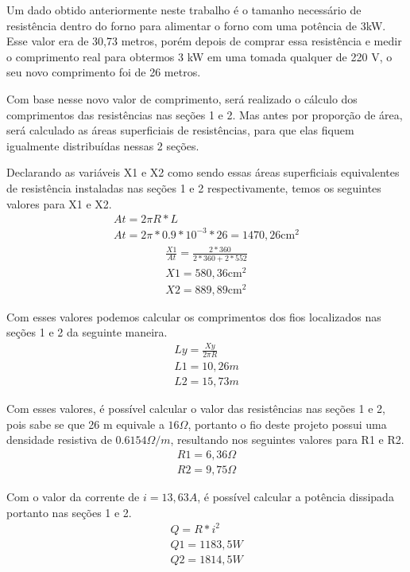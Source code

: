 Um dado obtido anteriormente neste trabalho é o tamanho necessário de resistência dentro do forno para alimentar o forno com uma potência de 3kW. Esse valor era de 30,73 metros, porém depois de comprar essa resistência e medir o comprimento real para obtermos 3 kW em uma tomada qualquer de 220 V, o seu novo comprimento foi de 26 metros.

Com base nesse novo valor de comprimento, será realizado o cálculo dos comprimentos das resistências nas seções 1 e 2. Mas antes por proporção de área, será calculado as áreas superficiais de resistências, para que elas fiquem igualmente distribuídas nessas 2 seções.

Declarando as variáveis X1 e X2 como sendo essas áreas superficiais equivalentes de resistência instaladas nas seções 1 e 2 respectivamente, temos os seguintes valores para X1 e X2.
\begin{gather}
    At = 2\pi R*L \\
    At = 2\pi * 0.9 * 10^{-3} * 26 = 1470,26\text{cm}^{2} \nonumber
\end{gather}
\begin{gather}
   \frac{X1}{At} = \frac{2 * 360}{2 * 360 + 2 * 552} \nonumber \\
   X1 = 580,36\text{cm}^{2} \nonumber \\
   X2 = 889,89\text{cm}^{2} \nonumber
\end{gather}

Com esses valores podemos calcular os comprimentos dos fios localizados nas seções 1 e 2 da seguinte maneira.
\begin{gather}
    Ly = \frac{Xy}{2\pi R} \\
    L1 = 10,26m \nonumber \\
    L2 = 15,73m \nonumber
\end{gather}


Com esses valores, é possível calcular o valor das resistências nas seções 1 e 2, pois sabe se que 26 m equivale a $16 \Omega$, portanto o fio deste projeto possui uma densidade resistiva de $0.6154 \Omega /m$, resultando nos seguintes valores para R1 e R2.
\begin{gather}
    R1 = 6,36\Omega \nonumber \\
    R2 = 9,75\Omega \nonumber
\end{gather}

Com o valor da corrente de $i = 13,63 A$, é possível calcular a potência dissipada portanto nas seções 1 e 2.
\begin{gather}
    Q = R*i^{2} \\
    Q1 = 1183,5W \nonumber \\
    Q2 = 1814,5W \nonumber
\end{gather}


